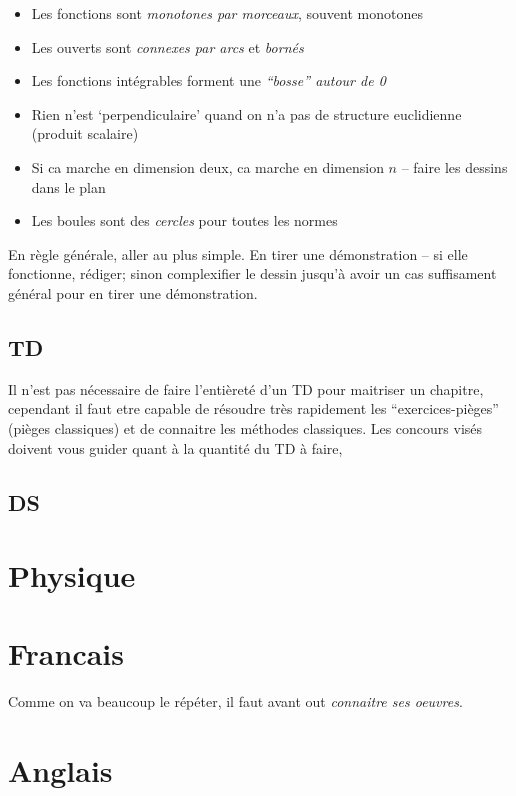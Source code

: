 \documentclass{article}
\begin{document}
\begin{itemize}
\item  Les fonctions sont \textit{monotones par morceaux}, souvent monotones
\item  Les ouverts sont \textit{connexes par arcs} et \textit{bornés}
\item  Les fonctions intégrables forment une \textit{``bosse'' autour de 0}
\item  Rien n'est `perpendiculaire' quand on n'a pas de structure euclidienne (produit scalaire)
\item  Si ca marche en dimension deux, ca marche en dimension $n$ -- faire les dessins dans le plan
\item  Les boules sont des \textit{cercles} pour toutes les normes

\end{itemize}

En règle générale, aller au plus simple. En tirer une démonstration -- si elle fonctionne, rédiger; sinon complexifier le dessin jusqu'à avoir un cas suffisament général pour en tirer une démonstration.

\subsection{TD}

Il n'est pas nécessaire de faire l'entièreté d'un TD pour maitriser un chapitre, cependant il faut etre capable de résoudre très rapidement les ``exercices-pièges'' (pièges classiques) et de connaitre les méthodes classiques.
Les concours visés doivent vous guider quant à la quantité du TD à faire,

\subsection{DS}



\section{Physique}
\section{Francais}

Comme on va beaucoup le répéter, il faut avant out \textit{connaitre ses oeuvres}.

\section{Anglais}
\end{document}

